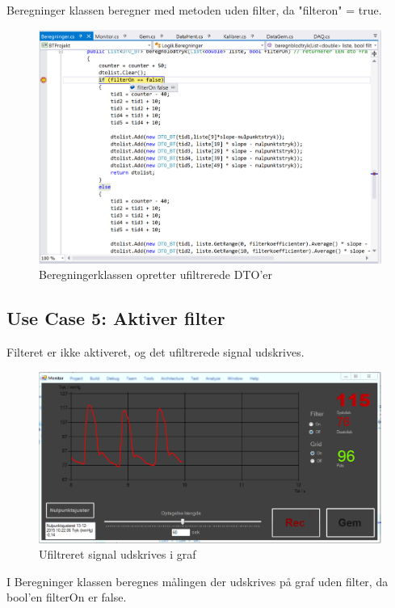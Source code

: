 Beregninger klassen beregner med metoden uden filter, da "filteron" = true.

\begin{figure}[H]
	\centering
	\includegraphics[width=1\textwidth]{Figurer/Test_Deaktiver_4}
	\caption{Beregningerklassen opretter ufiltrerede DTO'er}
\end{figure}

\subsection{Use Case 5: Aktiver filter}

Filteret er ikke aktiveret, og det ufiltrerede signal udskrives.

\begin{figure}[H]
	\centering
	\includegraphics[width=1\textwidth]{Figurer/Test_Aktiver_1}
	\caption{Ufiltreret signal udskrives i graf}
\end{figure}

I Beregninger klassen beregnes målingen der udskrives på graf uden filter, da bool'en filterOn er false.

